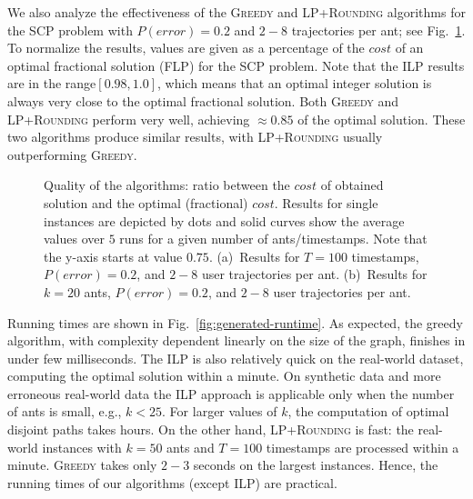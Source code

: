 \documentclass[runningheads]{llncs}
\newcommand{\SCoP}{\textsc{SCP}}
\newcommand{\alg}[1]{\textsc{#1}}
\begin{document}
We also analyze the effectiveness of the \alg{Greedy} and \alg{LP+Rounding} algorithms for the \SCoP{} problem
with $P(error)=0.2$ and $2-8$ trajectories per ant;
see Fig.~\ref{fig:generated}.
To normalize the results, values are given as a percentage of the $cost$ of an optimal fractional solution (\alg{FLP}) for the \SCoP{} problem. Note that the \alg{ILP} results are in the range$[0.98,1.0]$, which means that an optimal integer solution is always very close to the optimal fractional solution.
Both \alg{Greedy} and \alg{LP+Rounding} perform very well, achieving $\approx 0.85$ of the optimal solution. These two
algorithms produce similar results, with \alg{LP+Rounding} usually outperforming \alg{Greedy}.

\begin{figure}[tb]
    \center
\hfill
    \caption{Quality of the algorithms:
    ratio between the $cost$ of obtained solution and the optimal (fractional) $cost$.
    Results for single instances are depicted by dots and solid
    curves show the average values over $5$ runs
    for a given number of ants/timestamps.
    Note that the y-axis starts at value $0.75$.
    (a)~Results for $T=100$ timestamps, $P(error)=0.2$, and $2-8$ user trajectories per ant.
    (b)~Results for $k=20$ ants, $P(error)=0.2$, and $2-8$ user trajectories per ant.}
    \label{fig:generated}
\end{figure}

Running times are shown in Fig.~\ref{fig:generated-runtime}.
As expected, the greedy algorithm, with complexity dependent
linearly on the size of the graph, finishes in under few milliseconds.
The ILP is also relatively quick on the real-world dataset, computing the optimal solution within a minute.
On synthetic data and more erroneous real-world data
the
\alg{ILP} approach is applicable only when the number of ants is small, e.g., $k<25$. For larger values of $k$, the computation of optimal disjoint paths takes hours. On the other hand, \alg{LP+Rounding} is fast: the real-world
instances with $k=50$ ants and $T=100$ timestamps are processed within a minute. \alg{Greedy} takes only $2-3$ seconds on the largest instances. Hence, the running times of our algorithms (except \alg{ILP}) are practical.
\end{document}
